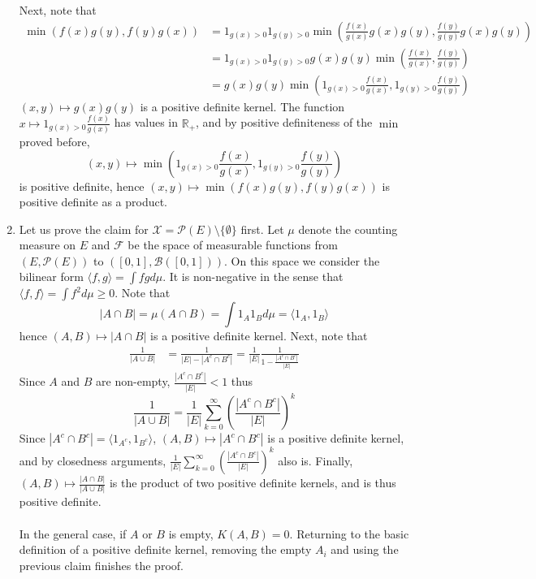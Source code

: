 \documentclass[a4paper,11pt, hidelinks]{article}
\begin{document}
\begin{enumerate}
  Next, note that $$\begin{aligned} \min(f(x)g(y), f(y)g(x)) &= 1_{g(x)>0}1_{g(y)>0} \min(\frac{f(x)}{g(x)} g(x)g(y), \frac{f(y)}{g(y)}g(x)g(y)) \\
  &= 1_{g(x)>0}1_{g(y)>0} g(x)g(y) \min(\frac{f(x)}{g(x)}, \frac{f(y)}{g(y)})\\
  &= g(x)g(y) \min(1_{g(x)>0}\frac{f(x)}{g(x)}, 1_{g(y)>0}\frac{f(y)}{g(y)})
  \end{aligned}$$
  $(x,y)\mapsto g(x)g(y)$ is a positive definite kernel. The function $x\mapsto 1_{g(x)>0}\frac{f(x)}{g(x)}$ has values in $\mathbb R_+$, and by positive definiteness of the $\min$ proved before, $$(x,y)\mapsto \min(1_{g(x)>0}\frac{f(x)}{g(x)}, 1_{g(y)>0}\frac{f(y)}{g(y)})$$ is positive definite, hence $(x,y) \mapsto \min(f(x)g(y), f(y)g(x))$ is positive definite as a product.
  \item Let us prove the claim for $\mathcal X = \mathcal P(E)\setminus \{\emptyset\}$ first. Let $\mu$ denote the counting measure on $E$ and $\mathcal F$ be the space of measurable functions from $(E,\mathcal P(E))$ to $([0,1], \mathcal B([0,1]))$. On this space we consider the bilinear form $\langle f, g\rangle = \int fg d\mu$. It is non-negative in the sense that $\langle f, f\rangle = \int f^2 d\mu \geq 0$. Note that $$|A\cap B| = \mu(A\cap B) = \int 1_A 1_B d\mu= \langle 1_A, 1_B \rangle$$ hence $(A,B)\mapsto |A\cap B|$ is a positive definite kernel. Next, note that $$\begin{aligned}
  \frac{1}{|A\cup B|} &= \frac{1}{|E|-|A^c\cap B^c|} = \frac{1}{|E|} \frac{1}{1-\frac{|A^c\cap B^c|}{|E|}}
  \end{aligned}$$
	Since $A$ and $B$ are non-empty, $\frac{|A^c\cap B^c|}{|E|} < 1$ thus $$\frac{1}{|A\cup B|} = \frac{1}{|E|} \sum_{k=0}^{\infty}  \left(\frac{|A^c\cap B^c|}{|E|}\right)^k$$
  Since $|A^c\cap B^c| = \langle 1_{A^c}, 1_{B^c}\rangle$, $(A,B)\mapsto |A^c\cap B^c|$ is a positive definite kernel, and by closedness arguments, $\displaystyle \frac{1}{|E|} \sum_{k=0}^{\infty}  \left(\frac{|A^c\cap B^c|}{|E|}\right)^k$ also is. Finally, $\displaystyle (A,B)\mapsto \frac{|A\cap B|}{|A\cup B|}$ is the product of two positive definite kernels, and is thus positive definite.\\ \\
  In the general case, if $A$ or $B$ is empty, $K(A,B)=0$. Returning to the basic definition of a positive definite kernel, removing the empty $A_i$ and using the previous claim finishes the proof.
\end{enumerate}
\end{document}
